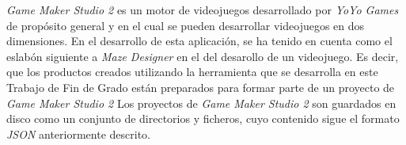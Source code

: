 \textit{Game Maker Studio 2} es un motor de videojuegos desarrollado por \textit{YoYo Games} de propósito general y en el cual se pueden desarrollar videojuegos en dos dimensiones.
En el desarrollo de esta aplicación, se ha tenido en cuenta como el eslabón siguiente a \textit{Maze Designer} en el  del desarollo de un videojuego. Es decir, que los productos creados utilizando la herramienta que se desarrolla en este Trabajo de Fin de Grado están preparados para formar parte de un proyecto de \textit{Game Maker Studio 2}
Los proyectos de \textit{Game Maker Studio 2} son guardados en disco como un conjunto de directorios y ficheros, cuyo contenido sigue el formato \textit{JSON} anteriormente descrito.